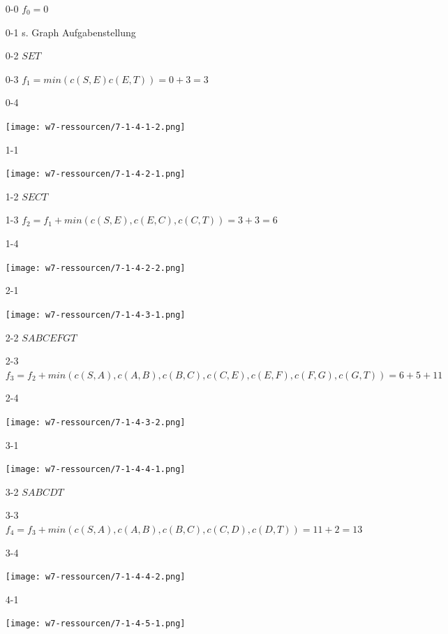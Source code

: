 \documentclass{article}
\begin{document}
\begin{enumerate}
	\item[0-0] $f_0=0$
	\item[0-1] s. Graph Aufgabenstellung
	\item[0-2] $SET$
	\item[0-3] $f_1 = min(c(S,E)c(E,T))=0+3=3$
	\item[0-4]\-\\ 
\begin{center}
	\texttt{[image: w7-ressourcen/7-1-4-1-2.png]}
\end{center}
	\item[1-1]\-\\
\begin{center}
	\texttt{[image: w7-ressourcen/7-1-4-2-1.png]}
\end{center}
	\item[1-2] $SECT$
	\item[1-3] $f_2=f_1+min(c(S,E),c(E,C),c(C,T))=3+3=6$
	\item[1-4]\-\\
\begin{center}
	\texttt{[image: w7-ressourcen/7-1-4-2-2.png]}
\end{center}
	\item[2-1]\-\\
\begin{center}
	\texttt{[image: w7-ressourcen/7-1-4-3-1.png]}
\end{center}
	\item[2-2] $SABCEFGT$
	\item[2-3] $f_3=f_2+min(c(S,A),c(A,B),c(B,C),c(C,E),c(E,F),c(F,G),c(G,T))=6+5+11$
	\item[2-4]\-\\
\begin{center}
	\texttt{[image: w7-ressourcen/7-1-4-3-2.png]}
\end{center}
	\item[3-1]\-\\
\begin{center}
	\texttt{[image: w7-ressourcen/7-1-4-4-1.png]}
\end{center}
	\item[3-2] $SABCDT$
	\item[3-3] $f_4=f_3+min(c(S,A),c(A,B),c(B,C),c(C,D),c(D,T))=11+2=13$
	\item[3-4]\-\\
\begin{center}
	\texttt{[image: w7-ressourcen/7-1-4-4-2.png]}
\end{center}
	\item[4-1]\-\\
\begin{center}
	\texttt{[image: w7-ressourcen/7-1-4-5-1.png]}
\end{center}
\end{enumerate}
\end{document}

